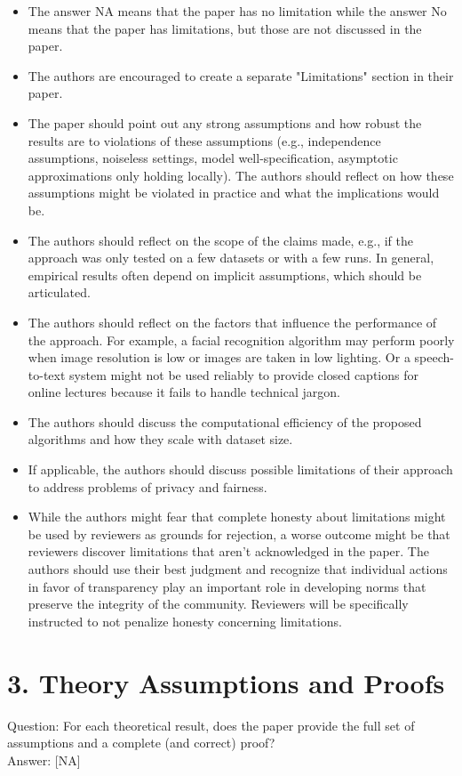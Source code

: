 \documentclass[10pt]{article}
\begin{document}
\begin{itemize}
  \item The answer NA means that the paper has no limitation while the answer No means that the paper has limitations, but those are not discussed in the paper.
  \item The authors are encouraged to create a separate "Limitations" section in their paper.
  \item The paper should point out any strong assumptions and how robust the results are to violations of these assumptions (e.g., independence assumptions, noiseless settings, model well-specification, asymptotic approximations only holding locally). The authors should reflect on how these assumptions might be violated in practice and what the implications would be.
  \item The authors should reflect on the scope of the claims made, e.g., if the approach was only tested on a few datasets or with a few runs. In general, empirical results often depend on implicit assumptions, which should be articulated.
  \item The authors should reflect on the factors that influence the performance of the approach. For example, a facial recognition algorithm may perform poorly when image resolution is low or images are taken in low lighting. Or a speech-to-text system might not be used reliably to provide closed captions for online lectures because it fails to handle technical jargon.
  \item The authors should discuss the computational efficiency of the proposed algorithms and how they scale with dataset size.
  \item If applicable, the authors should discuss possible limitations of their approach to address problems of privacy and fairness.
  \item While the authors might fear that complete honesty about limitations might be used by reviewers as grounds for rejection, a worse outcome might be that reviewers discover limitations that aren't acknowledged in the paper. The authors should use their best judgment and recognize that individual actions in favor of transparency play an important role in developing norms that preserve the integrity of the community. Reviewers will be specifically instructed to not penalize honesty concerning limitations.
\end{itemize}

\section*{3. Theory Assumptions and Proofs}
Question: For each theoretical result, does the paper provide the full set of assumptions and a complete (and correct) proof?\\[0pt]
Answer: [NA]
\end{document}
